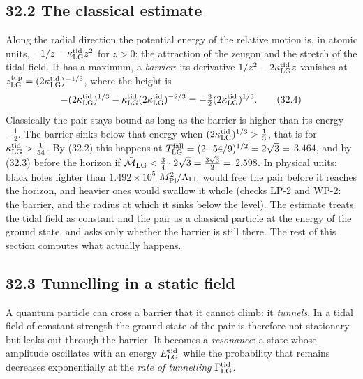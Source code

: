 \documentclass[
  10pt,
]{article}
\begin{document}
\hypertarget{the-classical-estimate}{%
\subsection{32.2 The classical estimate}\label{the-classical-estimate}}

Along the radial direction the potential energy of the relative motion
is, in atomic units, \(-1/z-\kappa^{\rm tid}_{\rm LG}z^2\) for \(z>0\):
the attraction of the zeugon and the stretch of the tidal field. It has
a maximum, a \emph{barrier}: its derivative
\(1/z^2-2\kappa^{\rm tid}_{\rm LG}z\) vanishes at
\(z^{\rm top}_{\rm LG}=(2\kappa^{\rm tid}_{\rm LG})^{-1/3}\), where the
height is
\[-(2\kappa^{\rm tid}_{\rm LG})^{1/3}-\kappa^{\rm tid}_{\rm LG}(2\kappa^{\rm tid}_{\rm LG})^{-2/3}=-\tfrac32(2\kappa^{\rm tid}_{\rm LG})^{1/3}.\tag{32.4}\]
Classically the pair stays bound as long as the barrier is higher than
its energy \(-\tfrac12\). The barrier sinks below that energy when
\((2\kappa^{\rm tid}_{\rm LG})^{1/3}>\tfrac13\), that is for
\(\kappa^{\rm tid}_{\rm LG}>\tfrac1{54}\). By (32.2) this happens at
\(T^{\rm fall}_{\rm LG}=(2\cdot54/9)^{1/2}=2\sqrt3=\) \(3.464\), and by
(32.3) before the horizon if
\(\tilde{\mathcal M}_{\rm LG}<\tfrac34\cdot2\sqrt3=\tfrac{3\sqrt3}2=\)
\(2.598\). In physical units: black holes lighter than
\(1.492\times10^{5}\) \(M_{\rm Pl}^2/\Lambda_{\rm LL}\) would free the
pair before it reaches the horizon, and heavier ones would swallow it
whole (checks LP-2 and WP-2: the barrier, and the radius at which it
sinks below the level). The estimate treats the tidal field as constant
and the pair as a classical particle at the energy of the ground state,
and asks only whether the barrier is still there. The rest of this
section computes what actually happens.

\hypertarget{tunnelling-in-a-static-field}{%
\subsection{32.3 Tunnelling in a static
field}\label{tunnelling-in-a-static-field}}

A quantum particle can cross a barrier that it cannot climb: it
\emph{tunnels}. In a tidal field of constant strength the ground state
of the pair is therefore not stationary but leaks out through the
barrier. It becomes a \emph{resonance}: a state whose amplitude
oscillates with an energy \(E^{\rm tid}_{\rm LG}\) while the probability
that remains decreases exponentially at the \emph{rate of tunnelling}
\(\Gamma^{\rm tid}_{\rm LG}\).
\end{document}
